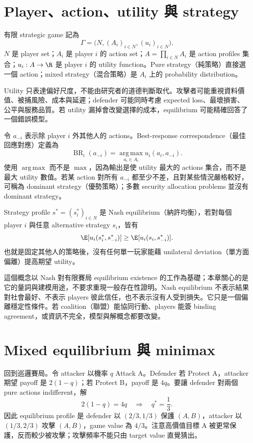 \documentclass[11pt,a4paper,oneside,openany]{book}
\begin{document}
\section{Player、action、utility 與 strategy}
\begin{definition}
有限 strategic game 記為
\[
 \Gamma=\bigl(N,(A_i)_{i\in N},(u_i)_{i\in N}\bigr).
\]
$N$ 是 player set；$A_i$ 是 player $i$ 的 action set；$A=\prod_{i\in N}A_i$ 是 action profiles 集合；$u_i:A\to\R$ 是 player $i$ 的 utility function。Pure strategy（純策略）直接選一個 action；mixed strategy（混合策略）是 $A_i$ 上的 probability distribution。
\end{definition}

Utility 只表達偏好尺度，不能由研究者的道德判斷取代。攻擊者可能重視資料價值、被捕風險、成本與延遲；defender 可能同時考慮 expected loss、最壞損害、公平與服務品質。若 utility 漏掉會改變選擇的成本，equilibrium 可能精確回答了一個錯誤模型。

令 $a_{-i}$ 表示除 player $i$ 外其他人的 actions。Best-response correspondence（最佳回應對應）定義為
\[
 \operatorname{BR}_i(a_{-i})
 =\operatorname*{arg\,max}_{a_i\in A_i}u_i(a_i,a_{-i}).
\]
使用 $\operatorname*{arg\,max}$ 而不是 $\max$，因為輸出是使 utility 最大的 actions 集合，而不是最大 utility 數值。若某 action 對所有 $a_{-i}$ 都至少不差，且對某些情況嚴格較好，可稱為 dominant strategy（優勢策略）；多數 security allocation problems 並沒有 dominant strategy。

\begin{definition}
Strategy profile $s^*=(s_i^*)_{i\in N}$ 是 Nash equilibrium（納許均衡），若對每個 player $i$ 與任意 alternative strategy $s_i$，皆有
\[
 \E[u_i(s_i^*,s_{-i}^*)]
 \ge
 \E[u_i(s_i,s_{-i}^*)].
\]
也就是固定其他人的策略後，沒有任何單一玩家能藉 unilateral deviation（單方面偏離）提高期望 utility。
\end{definition}

這個概念以 Nash 對有限賽局 equilibrium existence 的工作為基礎\cite{nash1950}；本章關心的是它的量詞與建模用途，不要求重現一般存在性證明。Nash equilibrium 不表示結果對社會最好、不表示 players 彼此信任，也不表示沒有人受到損失。它只是一個偏離穩定性條件。若 coalition（聯盟）能協同行動、players 能簽 binding agreement，或資訊不完全，模型與解概念都要改變。

\section{Mixed equilibrium 與 minimax}
回到巡邏賽局。令 attacker 以機率 $q$ Attack A。Defender 若 Protect A，attacker 期望 payoff 是 $2(1-q)$；若 Protect B，payoff 是 $4q$。要讓 defender 對兩個 pure actions indifferent，解
\[
 2(1-q)=4q
 \quad\Longrightarrow\quad
 q^*=\frac13.
\]
因此 equilibrium profile 是 defender 以 $(2/3,1/3)$ 保護 $(A,B)$，attacker 以 $(1/3,2/3)$ 攻擊 $(A,B)$，game value 為 $4/3$。注意高價值目標 A 被更常保護，反而較少被攻擊；攻擊頻率不能只由 target value 直覺猜出。
\end{document}
